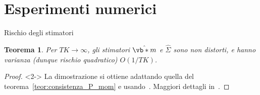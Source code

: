 \documentclass[10pt,xcolor={table,dvipsnames}]{beamer} 		%
\theoremstyle{plain}					%
\newtheorem{teorema}{Teorema}%
\theoremstyle{definition}
\theoremstyle{remark}
\begin{document}
\section{Esperimenti numerici}
    \begin{frame}{Rischio degli stimatori}
        \begin{teorema}
            Per $TK\to\infty$, gli stimatori $\hat{\vb*{m}}$ e $\hat{\Sigma}$ sono non distorti, e hanno varianza (dunque rischio quadratico) $O(1/TK)$. 
        \end{teorema}
        \begin{proof}<2->
            La dimostrazione si ottiene adattando quella del teorema~\ref{teor:consistenza_P_mom} e usando~\cite[12-12 (p.~528)]{book:Papoulis}. Maggiori dettagli in~\cite{article:main}.
        \end{proof}
        \medskip

        

    \end{frame}
\end{document}
